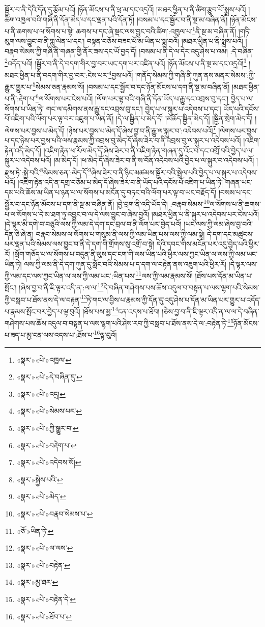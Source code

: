 སྦྱོར་བ་ནི་དེའི་དོན་དུ་རྩོམ་པའོ། །ཉོན་མོངས་པ་ནི་ཕྲ་མ་དང་འདྲའོ། །མཐར་ཕྱིན་པ་ནི་ཚིག་རྩུབ་པོ་སྨྲས་པའོ། །ཚིག་འཁྱལ་བའི་གཞི་ནི་དོན་མེད་པ་དང་ལྡན་པའི་དོན་ཏོ། །བསམ་པ་དང་སྦྱོར་བ་ནི་སྔ་མ་བཞིན་ནོ། །ཉོན་མོངས་པ་ནི་ཆགས་པ་ལ་སོགས་པ་སྟེ། ཆགས་པ་དང་ཞེ་སྡང་ལས་བྱུང་བའི་ཚིག་:འཁྱལ་པ་\footnote{«སྣར་»«པེ་»འཁྱལ་}ནི་སྔ་མ་བཞིན་ནོ། །གཏི་མུག་ལས་བྱུང་བ་ནི་གླུ་ལེན་པ་དང་། བསྟན་བཅོས་བཟང་པོ་མ་ཡིན་པ་སྨྲ་བའོ། །མཐར་ཕྱིན་པ་ནི་སྨྲས་པའོ། །བརྣབ་སེམས་ཀྱི་གཞི་ནི་གཞན་གྱི་ནོར་ཟས་དང་ཡོ་བྱད་དོ། །བསམ་པ་ནི་དེ་ལ་དེར་འདུ་ཤེས་པ་འམ། :དེ་བཞིན་\footnote{«སྣར་»«པེ་»དེ་བཞིན་དུ་}འདོད་པའོ། །སྦྱོར་བ་ནི་དེ་བདག་གིར་བྱ་བར་ཡང་དག་པར་འཛིན་པའོ། །ཉོན་མོངས་པ་ནི་སྔ་མ་དང་འདྲའོ།\footnote{«སྣར་»«པེ་»འདྲ།} །མཐར་ཕྱིན་པ་ནི་བདག་གིར་བྱ་བར་:ངེས་པར་\footnote{«སྣར་»«པེ་»སེམས་པར་}བྱས་པའོ། །གནོད་སེམས་ཀྱི་གཞི་ནི་ཀུན་ནས་མནར་སེམས་:ཀྱི་རྒྱུར་གྱུར་པ་\footnote{«སྣར་»«པེ་»ཀྱི་སྒྱུར་བ་}སེམས་ཅན་རྣམས་སོ། །བསམ་པ་དང་སྦྱོར་བ་དང་ཉོན་མོངས་པ་དག་ནི་སྔ་མ་བཞིན་ནོ། །མཐར་ཕྱིན་པ་ནི་:རྡེག་པ་\footnote{«སྣར་»«པེ་»བརྡེག་པ་}ལ་སོགས་པར་ངེས་པའོ། །ལོག་པར་ལྟ་བའི་གཞི་ནི་དོན་ཡོད་པ་རྒྱུ་དང་འབྲས་བུ་དང་། བྱེད་པ་ལ་སོགས་པ་ཡིན་ཏེ། གང་ལ་དམིགས་ནས་རྒྱུ་དང་འབྲས་བུ་དང་། བྱེད་པ་ལ་སྐུར་པ་འདེབས་པ་དང་། ཡོད་པའི་དངོས་པོ་འཇིག་པའི་ལོག་པར་ལྟ་བར་འཇུག་པ་ཡིན་ནོ། །དེ་ལ་སྦྱིན་པ་མེད་དོ། །མཆོད་སྦྱིན་མེད་དོ། །སྦྱིན་སྲེག་མེད་དོ། །ལེགས་པར་བྱས་པ་མེད་དོ། །ཉེས་པར་བྱས་པ་མེད་དོ་ཞེས་བྱ་བ་ནི་རྒྱུ་ལ་སྐུར་བ་:འདེབས་པའོ།\footnote{«སྣར་»«པེ་»འདེབས་སོ།} །ལེགས་པར་བྱས་པ་དང་ཉེས་པར་བྱས་པའི་ལས་རྣམས་ཀྱི་འབྲས་བུ་མེད་དོ་ཞེས་ཟེར་བ་ནི་འབྲས་བུ་ལ་སྐུར་པ་འདེབས་པའོ། །འཇིག་རྟེན་འདི་མེད་དོ། །འཇིག་རྟེན་ཕ་རོལ་མེད་དོ་ཞེས་ཟེར་བ་ནི་འཇིག་རྟེན་གཞན་དུ་འོང་བ་དང་འགྲོ་བའི་བྱེད་པ་ལ་སྐུར་པ་འདེབས་པའོ། །མ་མེད་དོ། །ཕ་མེད་དོ་ཞེས་ཟེར་བ་ནི་ས་བོན་འདེབས་པའི་བྱེད་པ་ལ་སྐུར་བ་འདེབས་པའོ། །རྫུས་ཏེ་:སྐྱེ་བའི་\footnote{«སྣར་»སྐྱེས་པའི་}སེམས་ཅན་:མེད་དོ་\footnote{«སྣར་»«པེ་»མེད་}ཞེས་ཟེར་བ་ནི་ཉིང་མཚམས་སྦྱོར་བའི་སྦྲེལ་པའི་བྱེད་པ་ལ་སྐུར་པ་འདེབས་པའོ། །འཇིག་རྟེན་འདི་ན་དགྲ་བཅོམ་པ་མེད་དོ་ཞེས་ཟེར་བ་ནི་ཡོད་པའི་དངོས་པོ་འཇིག་པ་ཡིན་ཏེ། གཞན་ཡང་དམ་པའི་ཆོས་མ་ཡིན་པ་ཉན་པ་ལ་སོགས་པ་མངོན་དུ་བཏང་བའི་ལོག་པར་ལྟ་བ་ཡང་བརྗོད་དོ། །བསམ་པ་དང་སྦྱོར་བ་དང་ཉོན་མོངས་པ་དག་ནི་སྔ་མ་བཞིན་ནོ། །བྱེ་བྲག་ནི་འདི་ཡོད་དེ། :བརྣབ་སེམས་\footnote{«སྣར་»«པེ་»བརྣབ་སེམས་པ་}ལ་སོགས་པ་ནི་ཆགས་པ་ལ་སོགས་པ་དེ་མ་ཐག་ཏུ་འབྱུང་བ་ལ་དེ་ལས་བྱུང་བ་ཞེས་བྱའོ། །མཐར་ཕྱིན་པ་ནི་སྐུར་པ་འདེབས་པར་ངེས་པའོ། །དེ་ལྟར་མི་དགེ་བ་བཅུའི་ལས་ཀྱི་ལམ་དེ་དག་དང་བྲལ་བ་ནི་ལོག་པར་བྱེད་པའོ། །ཡང་ལས་ཀྱི་ལམ་ཞེས་བྱ་བའི་དོན་ཅི་ཞེ་ན། བརྣབ་སེམས་ལ་སོགས་པ་གསུམ་ནི་ལས་ཀྱི་ལམ་ཡིན་པས་ལས་ཀྱི་ལམ་སྟེ། དེ་དག་དང་མཚུངས་པར་ལྡན་པའི་སེམས་ལས་བྱུང་བ་ནི་དེ་དག་གི་གྲོགས་སུ་འགྲོ་བ་སྟེ། དེའི་དབང་གིས་མངོན་པར་འདུ་བྱེད་པའི་ཕྱིར་རོ། །སྲོག་གཅོད་པ་ལ་སོགས་པ་བདུན་ནི་ལུས་དང་ངག་གི་ལས་ཡིན་པའི་ཕྱིར་ལས་ཀྱང་ཡིན་ལ་ལས་ཀྱི་ལམ་ཡང་ཡིན་ཏེ། ལས་ཀྱི་ལམ་ནི་དེ་དག་ཀུན་དུ་སློང་བའི་སེམས་པ་ད་དག་ལ་བརྟེན་ནས་འཇུག་པའི་ཕྱིར་རོ། །དེ་ལྟར་ལས་ཀྱི་ལམ་དང་ལས་ཀྱང་ཡིན་ལ་ལས་ཀྱི་ལམ་ཡང་:ཡིན་པས་\footnote{«ཅོ་»ཡིན་ཏེ་}ལས་ཀྱི་ལམ་རྣམས་སོ། །ཐོས་པས་དོན་མ་ཡིན་པ་སྤོང་། །ཞེས་བྱ་བ་ནི་ཇི་ལྟར་འདི་ན་:ལ་ལ་\footnote{«སྣར་»«པེ་»ལ་ལས་}དེ་བཞིན་གཤེགས་པས་ཆོས་འདུལ་བ་བསྟན་པ་ལས་ལྷག་པའི་སེམས་ཀྱི་བསླབ་པ་ཐོས་ནས་དེ་ལ་བརྟན་\footnote{«སྣར་»«པེ་»བརྟེན་}ཏེ་གང་ལ་བྱིས་པ་རྣམས་ཀྱི་དོན་དུ་འདུ་ཤེས་པ་དོན་མ་ཡིན་པར་གྱུར་པ་འདོད་པ་རྣམས་སྤོང་བར་བྱེད་པ་ལྟ་བུའོ། །ཐོས་པས་མྱ་\footnote{«སྣར་»མྱ་ཐར་}ངན་འདས་པ་ཐོབ། །ཅེས་བྱ་བ་ནི་ཇི་ལྟར་འདི་ན་ལ་ལ་དེ་བཞིན་གཤེགས་པས་ཆོས་འདུལ་བ་བསྟན་པ་ལས་ལྷག་པའི་ཤེས་རབ་ཀྱི་བསླབ་པ་ཐོས་ནས་དེ་ལ་:བརྟེན་ཏེ་\footnote{«སྣར་»«པེ་»བརྟེན་དེ་}ཉོན་མོངས་པ་ཟད་པ་མྱ་ངན་ལས་འདས་པ་:ཐོས་པ་\footnote{«སྣར་»«པེ་»ཐོབ་པ་}ལྟ་བུའོ། 
